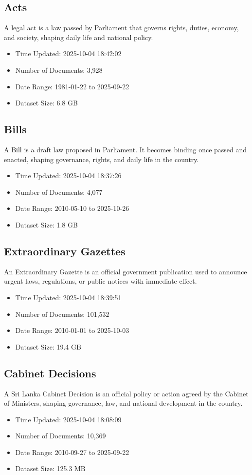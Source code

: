 \documentclass{article}%
\begin{document}
%
\subsection{Acts}%
\label{subsec:Acts}%
A legal act is a law passed by Parliament that governs rights, duties, economy, and society, shaping daily life and national policy.%
\begin{itemize}%
\item%
Time Updated: 2025{-}10{-}04 18:42:02%
\item%
Number of Documents: 3,928%
\item%
Date Range: 1981{-}01{-}22 to 2025{-}09{-}22%
\item%
Dataset Size: 6.8 GB%
\end{itemize}

%
\subsection{Bills}%
\label{subsec:Bills}%
A Bill is a draft law proposed in Parliament. It becomes binding once passed and enacted, shaping governance, rights, and daily life in the country.%
\begin{itemize}%
\item%
Time Updated: 2025{-}10{-}04 18:37:26%
\item%
Number of Documents: 4,077%
\item%
Date Range: 2010{-}05{-}10 to 2025{-}10{-}26%
\item%
Dataset Size: 1.8 GB%
\end{itemize}

%
\subsection{Extraordinary Gazettes}%
\label{subsec:ExtraordinaryGazettes}%
An Extraordinary Gazette is an official government publication used to announce urgent laws, regulations, or public notices with immediate effect.%
\begin{itemize}%
\item%
Time Updated: 2025{-}10{-}04 18:39:51%
\item%
Number of Documents: 101,532%
\item%
Date Range: 2010{-}01{-}01 to 2025{-}10{-}03%
\item%
Dataset Size: 19.4 GB%
\end{itemize}

%
\subsection{Cabinet Decisions}%
\label{subsec:CabinetDecisions}%
A Sri Lanka Cabinet Decision is an official policy or action agreed by the Cabinet of Ministers, shaping governance, law, and national development in the country.%
\begin{itemize}%
\item%
Time Updated: 2025{-}10{-}04 18:08:09%
\item%
Number of Documents: 10,369%
\item%
Date Range: 2010{-}09{-}27 to 2025{-}09{-}22%
\item%
Dataset Size: 125.3 MB%
\end{itemize}
\end{document}
